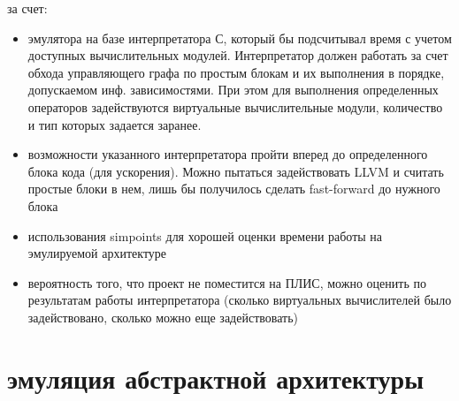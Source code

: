 \documentclass[utf8]{psta}%
\begin{document}
\cite{Sherwood2002}

за счет:

\begin{itemize}
   \item  эмулятора на базе интерпретатора С, который бы подсчитывал время с учетом доступных вычислительных модулей. Интерпретатор должен работать за счет обхода управляющего графа по простым блокам и их выполнения в порядке, допускаемом инф. зависимостями. При этом для выполнения определенных операторов задействуются виртуальные вычислительные модули, количество и тип которых задается заранее.
   \item возможности указанного интерпретатора пройти вперед до определенного блока кода (для ускорения). Можно пытаться задействовать LLVM и считать простые блоки в нем, лишь бы получилось сделать fast-forward до нужного блока
   \item использования simpoints для хорошей оценки времени работы на эмулируемой архитектуре
   \item вероятность того, что проект не поместится на ПЛИС, можно оценить по результатам работы интерпретатора (сколько виртуальных вычислителей было задействовано, сколько можно еще задействовать)
\end{itemize}

\section{эмуляция абстрактной архитектуры}

\cite{Takamaeda-Yamazaki2014}
  
   

\section{}
\subsection{}


% 


\end{document}
